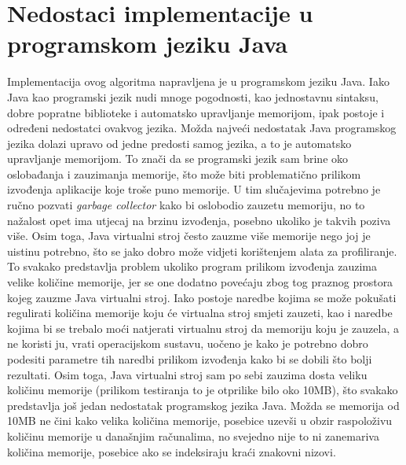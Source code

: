 \section{Nedostaci implementacije u programskom jeziku Java}
Implementacija ovog algoritma napravljena je u programskom jeziku Java.  Iako Java kao programski jezik nudi mnoge pogodnosti, kao jednostavnu sintaksu, dobre popratne biblioteke i automatsko upravljanje memorijom, ipak postoje i određeni nedostatci ovakvog jezika. Možda najveći nedostatak Java programskog jezika dolazi upravo od jedne predosti samog jezika, a to je automatsko upravljanje memorijom. To znači da se programski jezik sam brine oko oslobađanja i zauzimanja memorije, što može biti problematično prilikom izvođenja aplikacije koje troše puno memorije. U tim slučajevima potrebno je ručno pozvati \textit{garbage collector} kako bi oslobodio zauzetu memoriju, no to nažalost opet ima utjecaj na brzinu izvođenja, posebno ukoliko je takvih poziva više. Osim toga, Java virtualni stroj često zauzme više memorije nego joj je uistinu potrebno, što se jako dobro može vidjeti korištenjem alata za profiliranje. To svakako predstavlja problem ukoliko program prilikom izvođenja zauzima velike količine memorije, jer se one dodatno povećaju zbog tog praznog prostora kojeg zauzme Java virtualni stroj. Iako postoje naredbe kojima se može pokušati regulirati količina memorije koju će virtualna stroj smjeti zauzeti, kao i naredbe kojima bi se trebalo moći natjerati virtualnu stroj da memoriju koju je zauzela, a ne koristi ju, vrati operacijskom sustavu, uočeno je kako je potrebno dobro podesiti parametre tih naredbi prilikom izvođenja kako bi se dobili što bolji rezultati. Osim toga, Java virtualni stroj sam po sebi zauzima dosta veliku količinu memorije (prilikom testiranja to je otprilike bilo oko 10MB), što svakako predstavlja još jedan nedostatak programskog jezika Java. Možda se memorija od 10MB ne čini kako velika količina memorije, posebice uzevši u obzir raspoloživu količinu memorije u današnjim računalima, no svejedno nije to ni zanemariva količina memorije, posebice ako se indeksiraju kraći znakovni nizovi.

